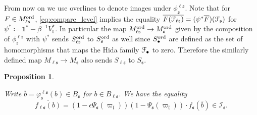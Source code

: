 \documentclass[leqno]{amsart}
\newtheorem{prop}[thm]{Proposition}
\theoremstyle{definition}
\theoremstyle{remark}
\newcommand{\id}{\mathbf{1}}
\newcommand{\fl}{\mathfrak{l}}
\newcommand{\fs}{\mathfrak{s}}
\newcommand{\euF}{\EuScript{F}} %
\newcommand{\I}{\mathcal{I}} %
\newcommand{\ord}{\textnormal{ord}} %
\begin{document}
From now on we use overlines to denote images 
under $\phi^{\ell\fs}_\fs$.
Note that for $F\in M_{\ell\fs}^{\ord}$,
\eqref{eq:compare_level} implies the equality
$\overline{F(\euF_{\ell\fs})}=(\psi^*\overline{F})(\euF_\fs)$
for $\psi^*\coloneqq \id^*-\beta^{-1}V_\fl^*$.
In particular the map 
$M_{\ell\fs}^{\ord}\to M_\fs^{\ord}$ given by
the composition of $\phi^{\ell\fs}_\fs$
with $\psi^*$ sends
$S_{\ell\fs}^{\ord}$ to $S_\fs^{\ord}$ as well
since $S^{\ord}_\bullet$
are defined as the set of homomorphisms
that maps the Hida family $\euF_\bullet$ to zero.
Therefore the similarly defined map
$M_{\ell\fs}\to M_\fs$ also sends
$S_{\ell\fs}$ to $S_\fs$.






\begin{prop}\label{prop:cores}

Write $\bar{b}=\varphi^{\ell\fs}_{\fs}(b)\in B_\fs$
for $b\in B_{\ell\fs}$.
We have the equality
\[
\overline{f_{\ell\fs}(b)}=
(1-\epsilon\Psi_{\fs}(\varpi_{\bar{\fl}}))
(1-\Psi_\fs(\varpi_{\bar{\fl}}))
\cdot f_\fs(\bar{b})\in \I_\fs.
\]
\end{prop}
\end{document}
